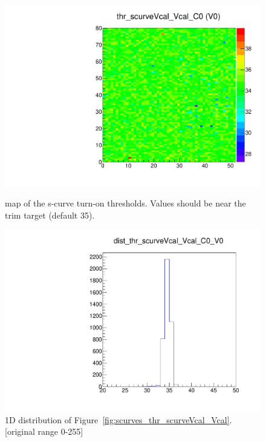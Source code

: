 \begin{figure}[!htp]
\centering
\begin{minipage}{0.45\textwidth}
  \includegraphics[width=1.0\textwidth]{figures/scurves_thr_scurveVcal_Vcal.pdf}
  \caption{\roc map of the \vcal s-curve turn-on thresholds.
  Values should be near the trim target (default 35).}
  \label{fig:scurves_thr_scurveVcal_Vcal}
\end{minipage}
\hspace{0.3cm}
\begin{minipage}{0.45\textwidth}
  \includegraphics[width=1.0\textwidth]{figures/scurves_dist_thr_scurveVcal_Vcal.pdf}
  \caption{1D distribution of Figure~\ref{fig:scurves_thr_scurveVcal_Vcal}.
  [original range 0-255]}
  \label{fig:scurves_dist_thr_scurveVcal_Vcal}
\end{minipage}
\end{figure}

